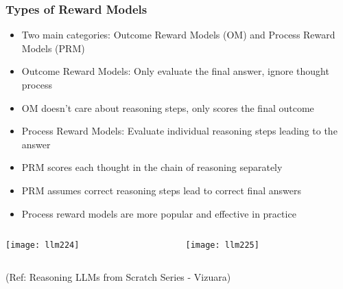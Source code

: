 \begin{frame}[fragile]\frametitle{Types of Reward Models}
      \begin{itemize}
        \item Two main categories: Outcome Reward Models (OM) and Process Reward Models (PRM)
        \item Outcome Reward Models: Only evaluate the final answer, ignore thought process
        \item OM doesn't care about reasoning steps, only scores the final outcome
        \item Process Reward Models: Evaluate individual reasoning steps leading to the answer
        \item PRM scores each thought in the chain of reasoning separately
        \item PRM assumes correct reasoning steps lead to correct final answers
        \item Process reward models are more popular and effective in practice
      \end{itemize}
	  
	  
\begin{columns}
    \begin{column}[T]{0.5\linewidth}
		\begin{center}
        \texttt{[image: llm224]}
		\end{center}

    \end{column}
    \begin{column}[T]{0.5\linewidth}
		\begin{center}
        \texttt{[image: llm225]}
		\end{center}
    \end{column}
  \end{columns}
		
		
		{\tiny (Ref:  Reasoning LLMs from Scratch Series - Vizuara)}
  
\end{frame}


